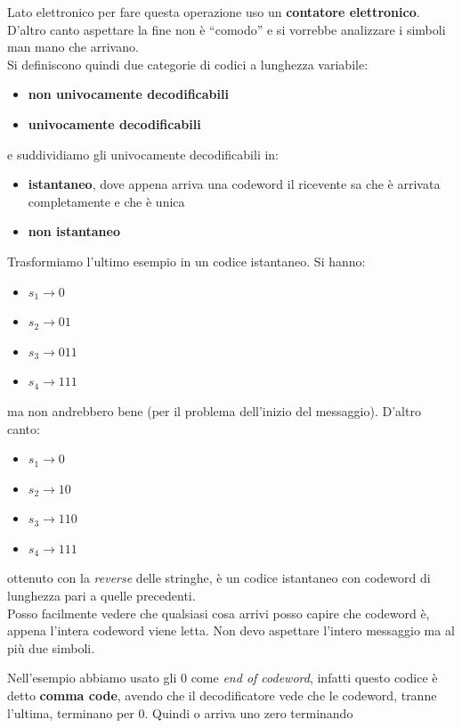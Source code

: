 \documentclass[a4paper,12pt, oneside]{book}
\begin{document}
Lato elettronico per fare questa operazione uso un \textbf{contatore
  elettronico}.\\
D'altro canto aspettare la fine non è ``comodo'' e si vorrebbe analizzare i
simboli man mano che arrivano.\\
Si definiscono quindi due categorie di codici a lunghezza variabile:
\begin{itemize}
  \item \textbf{non univocamente decodificabili}
  \item \textbf{univocamente decodificabili}
\end{itemize}
e suddividiamo gli univocamente decodificabili in:
\begin{itemize}
  \item \textbf{istantaneo}, dove appena arriva una codeword il ricevente sa che
  è arrivata completamente e che è unica
  \item \textbf{non istantaneo}
\end{itemize}
\begin{esempio}
  Trasformiamo l'ultimo esempio in un codice istantaneo. Si hanno:
  \begin{itemize}
    \item $s_1\to 0$
    \item $s_2\to 01$
    \item $s_3\to 011$
    \item $s_4\to 111$
  \end{itemize}
  ma non andrebbero bene (per il problema dell'inizio del messaggio). D'altro
  canto:
   \begin{itemize}
    \item $s_1\to 0$
    \item $s_2\to 10$
    \item $s_3\to 110$
    \item $s_4\to 111$
  \end{itemize}
  ottenuto con la \textit{reverse} delle stringhe, è un codice istantaneo con
  codeword di lunghezza pari a quelle precedenti.\\
  Posso facilmente vedere che qualsiasi cosa arrivi posso capire che codeword è,
  appena l'intera codeword viene letta. Non devo aspettare l'intero messaggio ma
  al più due simboli.
\end{esempio}
Nell'esempio abbiamo usato gli $0$ come \textit{end of codeword}, infatti questo
codice è detto \textbf{comma code}, avendo che il decodificatore vede che le
codeword, tranne l'ultima, terminano per 0. Quindi o arriva uno zero terminando
\end{document}
